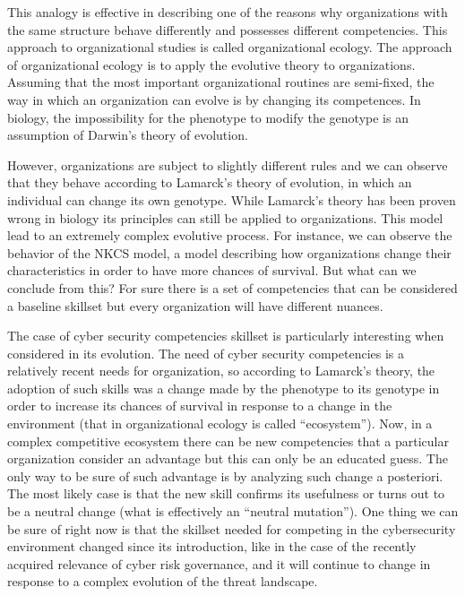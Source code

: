 \documentclass[a4paper, 10pt, conference]{ieeeconf}      %
\begin{document}
This analogy is effective in describing one of the reasons why organizations with the same structure behave differently and possesses different competencies. This approach to organizational studies is called organizational ecology. The approach of organizational ecology is to apply the evolutive theory to organizations. Assuming that the most important organizational routines are semi-fixed, the way in which an organization can evolve is by changing its competences. In biology, the impossibility for the phenotype to modify the genotype is an assumption of Darwin’s theory of evolution. 

However, organizations are subject to slightly different rules and we can observe that they behave according to Lamarck’s theory of evolution, in which an individual can change its own genotype. While Lamarck’s theory has been proven wrong in biology its principles can still be applied to organizations. This model lead to an extremely complex evolutive process. For instance, we can observe the behavior of the NKCS model, a model describing how organizations change their characteristics in order to have more chances of survival\cite{padget2009sendero}. But what can we conclude from this? For sure there is a set of competencies that can be considered a baseline skillset but every organization will have different nuances. 

The case of cyber security competencies skillset is particularly interesting when considered in its evolution. The need of cyber security competencies is a relatively recent needs for organization, so according to Lamarck’s theory, the adoption of such skills was a change made by the phenotype to its genotype in order to increase its chances of survival in response to a change in the environment (that in organizational ecology is called “ecosystem”). Now, in a complex competitive ecosystem there can be new competencies that a particular organization consider an advantage but this can only be an educated guess. The only way to be sure of such advantage is by analyzing such change a posteriori. The most likely case is that the new skill confirms its usefulness or turns out to be a neutral change (what is effectively an “neutral mutation”). One thing we can be sure of right now is that the skillset needed for competing in the cybersecurity environment changed since its introduction, like in the case of the recently acquired relevance of cyber risk governance, and it will continue to change in response to a complex evolution of the threat landscape. 

\printbibliography[heading=bibintoc]

\clearpage
\end{document}
